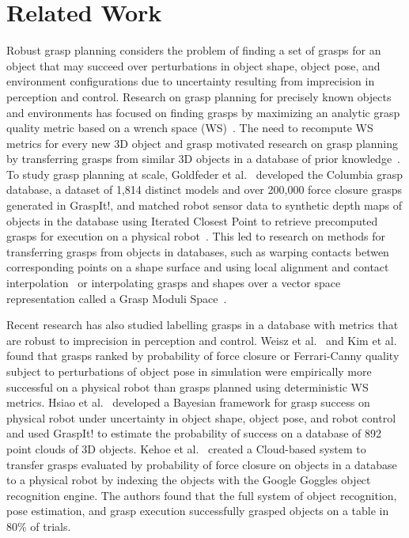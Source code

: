 \section{Related Work}

Robust grasp planning considers the problem of finding a set of grasps for an object that may succeed over perturbations in object shape,  object pose, and environment configurations due to uncertainty resulting from imprecision in perception and control.
Research on grasp planning for precisely known objects and environments has focused on finding grasps by maximizing an analytic grasp quality metric based on a wrench space (WS)~\cite{ferrari1992, liu2015fast}.
The need to recompute WS metrics for every new 3D object and grasp motivated research on grasp planning by transferring grasps from similar 3D objects in a database of prior knowledge~\cite{li2005shape}.
To study grasp planning at scale, Goldfeder et al.~\cite{goldfeder2009columbia} developed the Columbia grasp database, a dataset of 1,814 distinct models and over 200,000 force closure grasps generated in GraspIt!, and matched robot sensor data to synthetic depth maps of objects in the database using Iterated Closest Point to retrieve precomputed grasps for execution on a physical robot~\cite{goldfeder2011data}.
This led to research on methods for transferring grasps from objects in databases, such as warping contacts betwen corresponding points on a shape surface and using local alignment and contact interpolation~\cite{stouraitis2015functional} or interpolating grasps and shapes over a vector space representation called a Grasp Moduli Space~\cite{pokorny2013grasp}.

Recent research has also studied labelling grasps in a database with metrics that are robust to imprecision in perception and control.
Weisz et al.~\cite{weisz2012pose} and Kim et al.~\cite{kim2012physically} found that grasps ranked by probability of force closure or Ferrari-Canny quality subject to perturbations of object pose in simulation were empirically more successful on a physical robot than grasps planned using deterministic WS metrics.
Hsiao et al.~\cite{hsiao2011bayesian} developed a Bayesian framework for grasp success on physical robot under uncertainty in object shape, object pose, and robot control and used GraspIt! to estimate the probability of success on a database of 892 point clouds of 3D objects.
Kehoe et al.~\cite{kehoe2013cloud} created a Cloud-based system to transfer grasps evaluated by probability of force closure on objects in a database to a physical robot by indexing the objects with the Google Goggles object recognition engine.
The authors found that the full system of object recognition, pose estimation, and grasp execution successfully grasped objects on a table in 80\% of trials.

